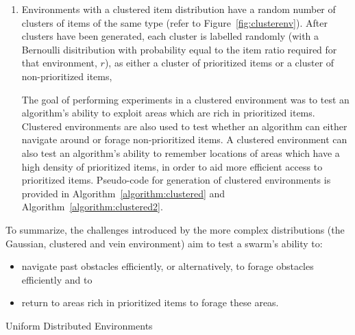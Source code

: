 \begin{enumerate}
\item Environments with a clustered item distribution have a random number of clusters of items of the same type (refer to Figure~\ref{fig:clusterenv}). After clusters have been generated, each cluster is labelled randomly (with a Bernoulli disitribution with probability equal to the item ratio required for that environment, $r$), as either a cluster of prioritized items or a cluster of non-prioritized items, 

The goal of performing experiments in a clustered environment was to test an algorithm's ability to exploit areas which are rich in prioritized items. Clustered environments are also used to test whether an algorithm can either navigate around or forage non-prioritized items. A clustered environment can also test an algorithm's ability to remember locations of areas which have a high density of prioritized items, in order to aid more efficient access to prioritized items.  Pseudo-code for generation of clustered environments is provided in Algorithm~\ref{algorithm:clustered} and Algorithm~\ref{algorithm:clustered2}.


\end{enumerate} 

To summarize, the challenges introduced by the more complex distributions (the Gaussian, clustered and vein environment) aim to test a swarm's ability to:

\begin{itemize}
\item navigate past obstacles efficiently, or alternatively, to forage obstacles efficiently and to
\item return to areas rich in prioritized items to forage these areas.
\end{itemize}



\begin{algorithm}

\caption{Uniform Distributed Environments}
\label{algorithm:uniform}
\begin{algorithmic}[1]
	\State {}
	\State {}
		\State {}
		\State {}
			\State {}
			\State {}
		\EndIf
	\EndWhile

		\State {}
		\State {}
			\State {}
			\State {}
		\EndIf
	\EndWhile
\EndFunction
\end{algorithmic}
\end{algorithm}


